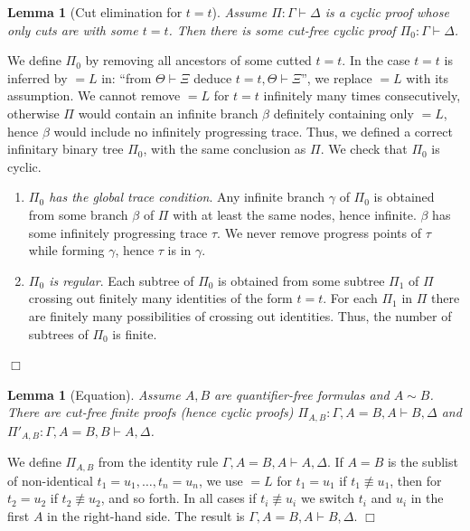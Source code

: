 \documentclass[a4paper,12pt]{article}
\newtheorem{lemma}[theorem]{Lemma}
\newenvironment{proof}[1][Proof]{\begin{trivlist}
\item[\hskip \labelsep {\bfseries #1}]}{\end{trivlist}}
\newcommand{\eqL}     {= \! \!  \!  L}
\begin{document}
\begin{lemma}[Cut elimination for $t=t$]
\label{lemma-identity}
Assume $\Pi: \Gamma \vdash \Delta$ is a cyclic proof whose only cuts are with some $t=t$. Then there is some cut-free cyclic proof $\Pi_0:\Gamma \vdash \Delta$.
\end{lemma}

\begin{proof}
We define $\Pi_0$ by removing all ancestors of some cutted $t=t$. In the case $t=t$ is inferred by $\eqL$ in: ``from $\Theta \vdash \Xi$ deduce $t=t, \Theta \vdash \Xi$'', we replace $\eqL$ with its assumption. We cannot remove $\eqL$ for $t=t$ infinitely many times consecutively, otherwise $\Pi$ would contain an infinite branch $\beta$ definitely containing only $\eqL$, hence $\beta$ would include no infinitely progressing trace. Thus, we defined a correct infinitary binary tree $\Pi_0$, with the same conclusion as $\Pi$. We check that $\Pi_0$ is cyclic. 
\begin{enumerate}
\item 
\emph{$\Pi_0$ has the global trace condition}. Any infinite branch $\gamma$ of $\Pi_0$ is obtained from some branch $\beta$ of $\Pi$ with at least the same nodes, hence infinite. $\beta$ has some infinitely progressing trace $\tau$. We never remove progress points of $\tau$ while forming $\gamma$, hence $\tau$ is in $\gamma$. 
\item
\emph{$\Pi_0$ is regular}.  Each subtree of $\Pi_0$ is obtained from some subtree $\Pi_1$ of $\Pi$ crossing out finitely many identities of the form $t=t$. For each $\Pi_1$ in $\Pi$ there are finitely many possibilities of crossing out identities. Thus, the number of subtrees of $\Pi_0$ is finite.
\end{enumerate}
$\Box$ \end{proof}



\begin{lemma}[Equation]
\label{lemma-equation}
Assume $A, B$ are quantifier-free formulas and $A \sim B$.
There are cut-free finite proofs (hence cyclic proofs) $\Pi_{A,B}:\Gamma, A=B, A  \vdash B, \Delta$ and $\Pi'_{A,B} : \Gamma, A=B, B  \vdash A, \Delta$.
\end{lemma}

\begin{proof}
We define $\Pi_{A,B}$ from the identity rule $\Gamma, A=B,A \vdash A, \Delta$. If $A=B$ is the sublist of non-identical $t_1=u_1, \ldots, t_n = u_n$, we use $\eqL$ for $t_1=u_1$ if $t_1 \not \equiv u_1$, then for $t_2 = u_2$ if $t_2 \not \equiv u_2$, and so forth. In all cases if $t_i \not \equiv u_i$ we switch $t_i$ and $u_i$ in the first $A$ in the right-hand side. The result is $\Gamma, A=B,A \vdash B, \Delta$. 
$\Box$ \end{proof}
\end{document}
